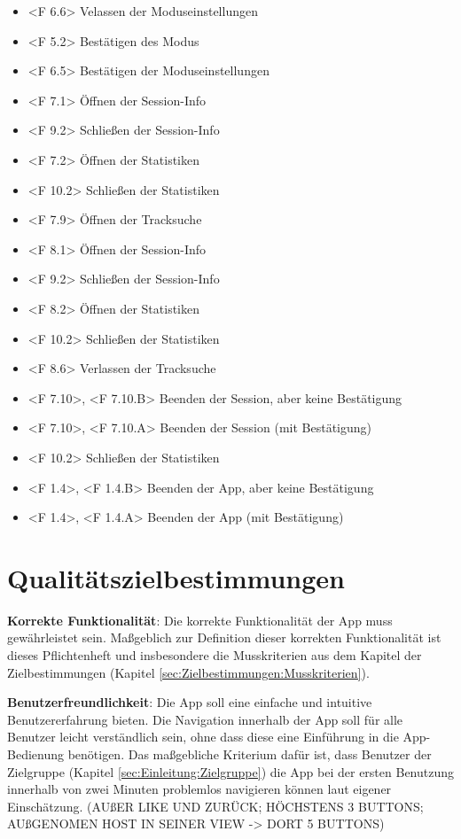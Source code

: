 \documentclass[oneside, ngerman]{sdqtechreport}
\begin{document}
\begin{itemize}
    \item <F 6.6> Velassen der Moduseinstellungen
    \item <F 5.2> Bestätigen des Modus
    \item <F 6.5> Bestätigen der Moduseinstellungen
    \item <F 7.1> Öffnen der Session-Info
    \item <F 9.2> Schließen der Session-Info
    \item <F 7.2> Öffnen der Statistiken
    \item <F 10.2> Schließen der Statistiken
    \item <F 7.9> Öffnen der Tracksuche
    \item <F 8.1> Öffnen der Session-Info
    \item <F 9.2> Schließen der Session-Info
    \item <F 8.2> Öffnen der Statistiken
    \item <F 10.2> Schließen der Statistiken
    \item <F 8.6> Verlassen der Tracksuche
    \item <F 7.10>, <F 7.10.B> Beenden der Session, aber keine Bestätigung
    \item <F 7.10>, <F 7.10.A> Beenden der Session (mit Bestätigung)
    \item <F 10.2> Schließen der Statistiken
    \item <F 1.4>, <F 1.4.B> Beenden der App, aber keine Bestätigung
    \item <F 1.4>, <F 1.4.A> Beenden der App (mit Bestätigung)
\end{itemize}


\chapter{Qualitätszielbestimmungen}
\label{chap:Qualitätszielbestimmungen}

\textbf{Korrekte Funktionalität}: Die korrekte Funktionalität der App muss gewährleistet sein. Maßgeblich zur Definition dieser korrekten Funktionalität ist dieses Pflichtenheft und insbesondere die Musskriterien aus dem Kapitel der Zielbestimmungen (Kapitel \ref{sec:Zielbestimmungen:Musskriterien}).

\textbf{Benutzerfreundlichkeit}: Die App soll eine einfache und intuitive Benutzererfahrung bieten. Die Navigation innerhalb der App soll für alle Benutzer leicht verständlich sein, ohne dass diese eine Einführung in die App-Bedienung benötigen. Das maßgebliche Kriterium dafür ist, dass Benutzer der Zielgruppe (Kapitel \ref{sec:Einleitung:Zielgruppe}) die App bei der ersten Benutzung innerhalb von zwei Minuten problemlos navigieren können laut eigener Einschätzung. (AUßER LIKE UND ZURÜCK; HÖCHSTENS 3 BUTTONS; AUßGENOMEN HOST IN SEINER VIEW -> DORT 5 BUTTONS)
\label{Qualitätszielbestimmungen_Benutzerfreundlichkeit}
\end{document}
